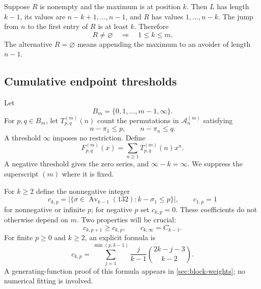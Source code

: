 \documentclass[11pt,a4paper]{article}
\theoremstyle{definition}\newaliascnt{definition}{theorem}
\theoremstyle{remark}\newaliascnt{remark}{theorem}
\newcommand{\Av}{\operatorname{Av}}
\newcommand{\Aclass}{\mathcal A}
\begin{document}
Suppose $R$ is nonempty and the maximum is at position $k$. Then $L$ has
length $k-1$, its values are $n-k+1,\ldots,n-1$, and $R$ has values
$1,\ldots,n-k$. The jump from $n$ to the first entry of $R$ is at least $k$.
Therefore
\begin{equation}
 R\ne\varnothing\quad\Longrightarrow\quad 1\le k\le m.
 \label{eq:max-position}
\end{equation}
The alternative $R=\varnothing$ means appending the maximum to an avoider
of length $n-1$.

\subsection{Cumulative endpoint thresholds}
Let
\[
 B_m=\{0,1,\ldots,m-1,\infty\}.
\]
For $p,q\in B_m$, let $T_{p,q}^{(m)}(n)$ count the permutations in
$\Aclass_n^{(m)}$ satisfying
\[
 n-\pi_1\le p,\qquad n-\pi_n\le q.
\]
A threshold $\infty$ imposes no restriction. Define
\[
 F_{p,q}^{(m)}(x)=\sum_{n\ge1}T_{p,q}^{(m)}(n)x^n.
\]
A negative threshold gives the zero series, and $\infty-k=\infty$.
We suppress the superscript $(m)$ where it is fixed.

For $k\ge2$ define the nonnegative integer
\begin{equation}
 c_{k,p}=\bigl|\{\sigma\in\Av_{k-1}(132):k-\sigma_1\le p\}\bigr|,
 \qquad c_{1,p}=1
 \label{eq:c-def}
\end{equation}
for nonnegative or infinite $p$; for negative $p$ set $c_{k,p}=0$.
These coefficients do not otherwise depend on $m$. Two properties will be
crucial:
\begin{equation}
 c_{k,p+1}\ge c_{k,p},\qquad c_{k,\infty}=C_{k-1}.
 \label{eq:c-monotone}
\end{equation}
For finite $p\ge0$ and $k\ge2$, an explicit formula is
\begin{equation}
 c_{k,p}=\sum_{j=1}^{\min(p,k-1)}
 \frac{j}{k-1}\binom{2k-j-3}{k-2}.
 \label{eq:c-formula}
\end{equation}
A generating-function proof of this formula appears in
\cref{sec:block-weights}; no numerical fitting is involved.
\end{document}
